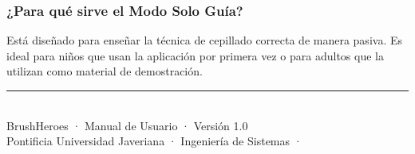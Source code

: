 \documentclass[12pt, a4paper]{article}
\begin{document}
\subsubsection*{¿Para qué sirve el Modo Solo Guía?}
Está diseñado para enseñar la técnica de cepillado correcta de manera pasiva. Es ideal
para niños que usan la aplicación por primera vez o para adultos que la utilizan como
material de demostración.

\vfill
\begin{center}
  \small\color{heroGray}\rule{0.5\textwidth}{0.4pt}\\[6pt]
  BrushHeroes · Manual de Usuario · Versión 1.0\\
  Pontificia Universidad Javeriana · Ingeniería de Sistemas · \the\year
\end{center}
\end{document}
